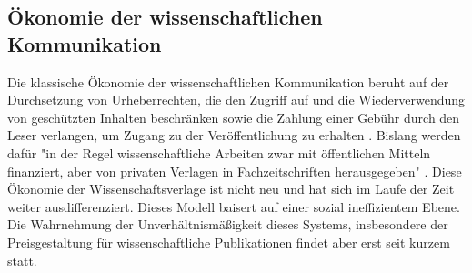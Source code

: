 \subsection{Ökonomie der wissenschaftlichen Kommunikation}
Die klassische Ökonomie der wissenschaftlichen Kommunikation beruht auf der Durchsetzung von Urheberrechten, die den Zugriff auf und die Wiederverwendung von geschützten Inhalten beschränken sowie die Zahlung einer Gebühr durch den Leser verlangen, um Zugang zu der Veröffentlichung zu erhalten \cite{CREATe_2014}. Bislang werden dafür "in der Regel wissenschaftliche Arbeiten zwar mit öffentlichen Mitteln finanziert, aber von privaten Verlagen in Fachzeitschriften herausgegeben" \cite{WD_bundestag_2009}. Diese Ökonomie der Wissenschaftsverlage ist nicht neu und hat sich im Laufe der Zeit weiter ausdifferenziert. Dieses Modell baisert auf einer sozial ineffizientem Ebene\cite{mueller-langer_2010}. Die Wahrnehmung der Unverhältnismäßigkeit dieses Systems, insbesondere der Preisgestaltung für wissenschaftliche Publikationen \cite{King_2008} findet aber erst seit kurzem statt\cite{CREATe_2014}. 


